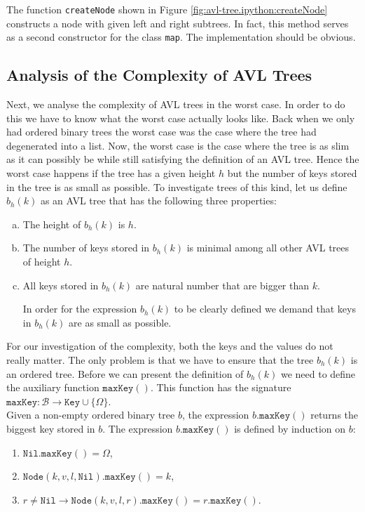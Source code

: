 The function \texttt{createNode} shown in Figure \ref{fig:avl-tree.ipython:createNode}
constructs a node with given left and right subtrees.  In fact, this method serves as a second
constructor for the class \texttt{map}.  The implementation should be obvious.


\subsection{Analysis of the Complexity of AVL Trees}
Next, we analyse the complexity of AVL trees in the worst case.  In order to do this we have to know
what the worst case actually looks like.  Back when we only had ordered binary trees the worst case was the case where
the tree had degenerated into a list.  Now, the worst case is the case where the tree is as slim as
it can possibly be while still satisfying the definition of an AVL tree.  Hence the worst case
happens if the tree has a given height $h$ but the number of keys stored in the tree is as small as
possible.  To investigate trees of this kind, let us define  $b_h(k)$ as an AVL tree that has the following three
properties:
\begin{enumerate}[(a)]
\item The height of $b_h(k)$ is $h$.
\item The number of keys stored in $b_h(k)$ is minimal among all other AVL trees of height $h$.  
\item All keys stored in  $b_h(k)$ are natural number that are bigger than  $k$.

      In order for the expression $b_h(k)$ to be clearly defined we demand that keys
      in $b_h(k)$ are as small as possible.
\end{enumerate}
For our investigation of the complexity, both the keys and the values do not really matter.  The only problem
is that we have to ensure that the tree $b_h(k)$ is an ordered tree.
Before we can present the definition of $b_h(k)$ we need to define the auxiliary function
 $\texttt{maxKey}()$.  This function has the signature 
\\[0.2cm]
\hspace*{1.3cm}
$\texttt{maxKey}:\mathcal{B} \rightarrow \texttt{Key} \cup \{ \Omega \}$.
\\[0.2cm]
Given a non-empty ordered binary tree  $b$, the expression $b.\texttt{maxKey}()$ returns the biggest
key stored in $b$.  The expression  $b.\texttt{maxKey}()$ is defined by induction on $b$:
\begin{enumerate}
\item $\texttt{Nil}.\texttt{maxKey}() = \Omega$,
\item $\texttt{Node}(k,v,l,\texttt{Nil}).\texttt{maxKey}() = k$,
\item $r \not= \texttt{Nil} \rightarrow \texttt{Node}(k,v,l,r).\texttt{maxKey}() = r.\texttt{maxKey}()$.
\end{enumerate}
